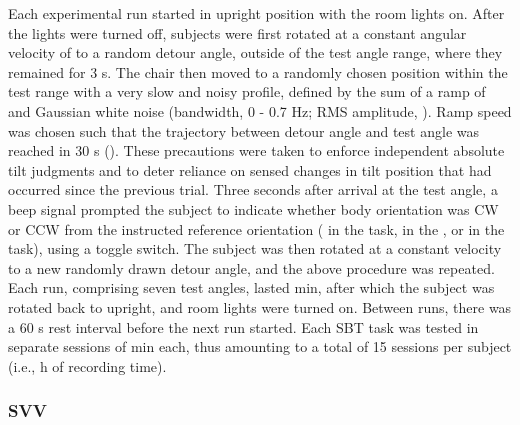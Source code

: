 Each experimental run started in upright position with the room lights on. After the lights were turned off, subjects were first rotated at a constant angular velocity of  to a random detour angle, outside of the test angle range, where they remained for 3 s. The chair then moved to a randomly chosen position within the test range with a very slow and noisy profile, defined by the sum of a ramp of  and Gaussian white noise (bandwidth, 0 - 0.7 Hz; RMS amplitude, ). Ramp speed was chosen such that the trajectory between detour angle and test angle was reached in 30 \si{\second} (). These precautions were taken to enforce independent absolute tilt judgments and to deter reliance on sensed changes in tilt position that had occurred since the previous trial. Three seconds after arrival at the test angle, a beep signal prompted the subject to indicate whether body orientation was CW or CCW from the instructed reference orientation ( in the  task,  in the , or  in the  task), using a toggle switch. The subject was then rotated at a constant velocity to a new randomly drawn detour angle, and the above procedure was repeated. Each run, comprising seven test angles, lasted  min, after which the subject was rotated back to upright, and room lights were turned on. Between runs, there was a 60 s rest interval before the next run started. Each SBT task was tested in separate sessions of  min each, thus amounting to a total of 15 sessions per subject (i.e.,  h of recording time).

\subsubsection{SVV}
 
